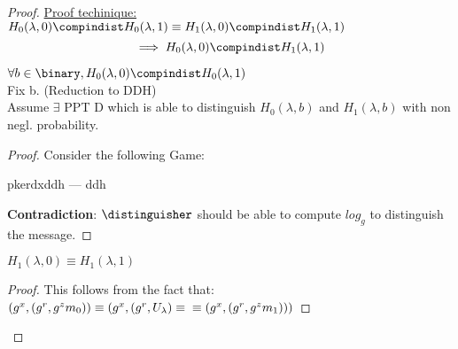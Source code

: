 \begin{proof}
    

    \underline{Proof techinique:}
    $H_0(\lambda,0) \compindist H_0(\lambda,1)\equiv H_1(\lambda,0) \compindist H_1(\lambda,1)$
    $$\implies H_0(\lambda,0) \compindist H_1(\lambda,1)$$

    \begin{lemma}
        $\forall b \in \binary, H_0(\lambda,0) \compindist H_0(\lambda,1)$\\
        Fix b. (Reduction to DDH)\\
        Assume $\exists$ PPT D which is able to distinguish $H_0(\lambda,b)$ and $H_1(\lambda,b)$ with non negl. probability.
    \end{lemma}

    \begin{proof}

        Consider the following Game:

        \begin{cryptoredux}
            {pkerdxddh}
            {---}
            {ddh}
            {}




        \end{cryptoredux}

        \textbf{Contradiction}: $\distinguisher$ should be able to compute $log_g$ to distinguish the message.

    \end{proof}

    \begin{lemma}
        $H_1(\lambda,0)\equiv H_1(\lambda,1)$
    \end{lemma}
    \begin{proof}
        This follows from the fact that:
        $(g^x,(g^r,g^z m_0))\equiv (g^x,(g^r,U_{\lambda}) \equiv \\ \equiv (g^x,(g^r,g^z m_1)))$
    \end{proof}
    

\end{proof}
